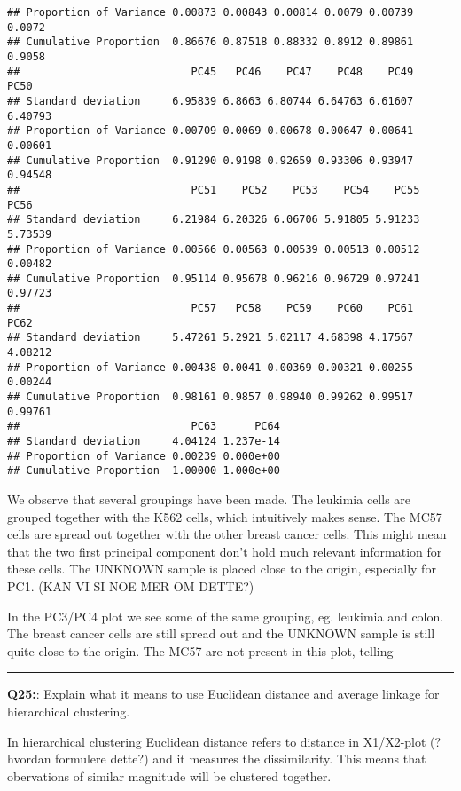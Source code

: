 \documentclass[]{article}
\begin{document}
\begin{verbatim}
## Proportion of Variance 0.00873 0.00843 0.00814 0.0079 0.00739 0.0072
## Cumulative Proportion  0.86676 0.87518 0.88332 0.8912 0.89861 0.9058
##                           PC45   PC46    PC47    PC48    PC49    PC50
## Standard deviation     6.95839 6.8663 6.80744 6.64763 6.61607 6.40793
## Proportion of Variance 0.00709 0.0069 0.00678 0.00647 0.00641 0.00601
## Cumulative Proportion  0.91290 0.9198 0.92659 0.93306 0.93947 0.94548
##                           PC51    PC52    PC53    PC54    PC55    PC56
## Standard deviation     6.21984 6.20326 6.06706 5.91805 5.91233 5.73539
## Proportion of Variance 0.00566 0.00563 0.00539 0.00513 0.00512 0.00482
## Cumulative Proportion  0.95114 0.95678 0.96216 0.96729 0.97241 0.97723
##                           PC57   PC58    PC59    PC60    PC61    PC62
## Standard deviation     5.47261 5.2921 5.02117 4.68398 4.17567 4.08212
## Proportion of Variance 0.00438 0.0041 0.00369 0.00321 0.00255 0.00244
## Cumulative Proportion  0.98161 0.9857 0.98940 0.99262 0.99517 0.99761
##                           PC63      PC64
## Standard deviation     4.04124 1.237e-14
## Proportion of Variance 0.00239 0.000e+00
## Cumulative Proportion  1.00000 1.000e+00
\end{verbatim}

We observe that several groupings have been made. The leukimia cells are
grouped together with the K562 cells, which intuitively makes sense. The
MC57 cells are spread out together with the other breast cancer cells.
This might mean that the two first principal component don't hold much
relevant information for these cells. The UNKNOWN sample is placed close
to the origin, especially for PC1. (KAN VI SI NOE MER OM DETTE?)

In the PC3/PC4 plot we see some of the same grouping, eg. leukimia and
colon. The breast cancer cells are still spread out and the UNKNOWN
sample is still quite close to the origin. The MC57 are not present in
this plot, telling

\begin{center}\rule{0.5\linewidth}{\linethickness}\end{center}

\textbf{Q25:}: Explain what it means to use Euclidean distance and
average linkage for hierarchical clustering.

In hierarchical clustering Euclidean distance refers to distance in
X1/X2-plot (?hvordan formulere dette?) and it measures the
dissimilarity. This means that obervations of similar magnitude will be
clustered together.
\end{document}
